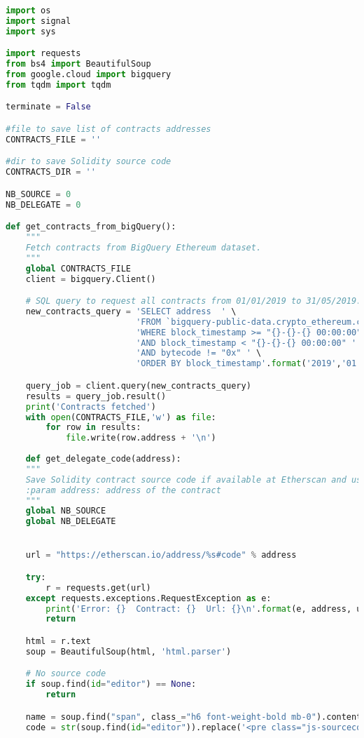 \begin{lstlisting}[language=Python]
import os
import signal
import sys

import requests
from bs4 import BeautifulSoup
from google.cloud import bigquery
from tqdm import tqdm

terminate = False

#file to save list of contracts addresses
CONTRACTS_FILE = ''

#dir to save Solidity source code
CONTRACTS_DIR = ''

NB_SOURCE = 0
NB_DELEGATE = 0

def get_contracts_from_bigQuery():
    """
    Fetch contracts from BigQuery Ethereum dataset.
    """
    global CONTRACTS_FILE
    client = bigquery.Client()

    # SQL query to request all contracts from 01/01/2019 to 31/05/2019.
    new_contracts_query = 'SELECT address  ' \
                          'FROM `bigquery-public-data.crypto_ethereum.contracts` ' \
                          'WHERE block_timestamp >= "{}-{}-{} 00:00:00" ' \
                          'AND block_timestamp < "{}-{}-{} 00:00:00" ' \
                          'AND bytecode != "0x" ' \
                          'ORDER BY block_timestamp'.format('2019','01','01','2019','05','31')

    query_job = client.query(new_contracts_query)
    results = query_job.result()
    print('Contracts fetched')
    with open(CONTRACTS_FILE,'w') as file:
        for row in results:
            file.write(row.address + '\n')
    
    def get_delegate_code(address):
    """
    Save Solidity contract source code if available at Etherscan and using delegatecall in CONTRACTS_DIR.
    :param address: address of the contract
    """
    global NB_SOURCE
    global NB_DELEGATE


    url = "https://etherscan.io/address/%s#code" % address

    try:
        r = requests.get(url)
    except requests.exceptions.RequestException as e:
        print('Error: {}  Contract: {}  Url: {}\n'.format(e, address, url))
        return

    html = r.text
    soup = BeautifulSoup(html, 'html.parser')

    # No source code
    if soup.find(id="editor") == None:
        return

    name = soup.find("span", class_="h6 font-weight-bold mb-0").contents[0]
    code = str(soup.find(id="editor")).replace('<pre class="js-sourcecopyarea editor" id="editor" style="margin-top: 5px;">', '').replace('</pre>','')


\end{lstlisting}

